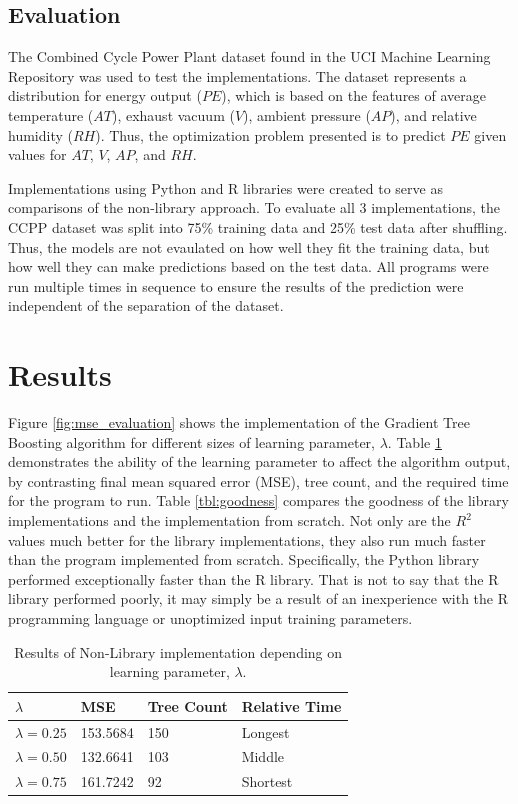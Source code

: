 \documentclass[letterpaper]{article} %
\begin{document}
\subsection{Evaluation}
The Combined Cycle Power Plant dataset
found in the UCI Machine Learning Repository was used to test the implementations.
The dataset represents a distribution for energy output ($PE$),
which is based on the features of
average temperature ($AT$),
exhaust vacuum ($V$),
ambient pressure ($AP$),
and relative humidity ($RH$).
Thus, the optimization problem presented is to predict $PE$ given
values for $AT$, $V$, $AP$, and $RH$.

Implementations using Python and R libraries were created
to serve as comparisons of the non-library approach.
To evaluate all 3 implementations, the CCPP dataset was split into 75\% training data and 25\% test data
after shuffling. Thus, the models are not evaulated on how well they fit the
training data, but how well they can make predictions based on the test data.
All programs were run multiple times in sequence to ensure the results of the prediction were
independent of the separation of the dataset.

\section{Results}
Figure \ref{fig:mse_evaluation} shows the implementation of the
Gradient Tree Boosting algorithm for different sizes of learning parameter,
$\lambda$. Table \ref{tbl:contrast} demonstrates the ability of the learning
parameter to affect the algorithm output, by contrasting
final mean squared error (MSE), tree count,
and the required time for the program to run.
Table \ref{tbl:goodness} compares the goodness of the library implementations
and the implementation from scratch.
Not only are the $R^2$ values much better for the library implementations,
they also run much faster than the program implemented from scratch.
Specifically, the Python library performed exceptionally faster than the R
library. That is not to say that the R library
performed poorly, it may simply be a result of an inexperience with the R
programming language or unoptimized input training parameters.

\begin{table}[t]
\begin{centering}
\bgroup
\def\arraystretch{1.5}
\begin{tabular}{| m{} || m{} | m{}| m{}|} 
\hline
$\lambda$ & MSE & Tree Count & Relative Time \\ 
\hline
\hline
$\lambda = 0.25$ & 153.5684 & 150 & Longest \\
\hline
$\lambda = 0.50$ & 132.6641 & 103 & Middle \\
\hline
$\lambda = 0.75$ & 161.7242 & 92 & Shortest \\
\hline
\end{tabular}
\caption{Results of Non-Library implementation depending on learning parameter, $\lambda$.}
\label{tbl:contrast}
\egroup
\end{centering}
\end{table}
\end{document}
